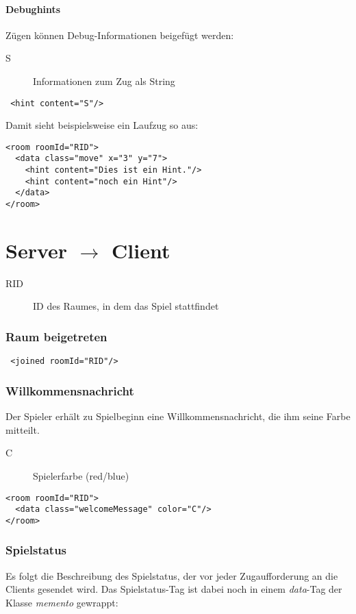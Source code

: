\documentclass[12pt,a4paper, ngerman, oneside]{scrartcl}
\begin{document}
\subsection{Debughints}
Z\"ugen k\"onnen Debug-Informationen beigef\"ugt werden:
\begin{description}
\item[S] Informationen zum Zug als String
\end{description}
\begin{verbatim}
 <hint content="S"/>
\end{verbatim}
Damit sieht beispielsweise ein Laufzug so aus:
\begin{verbatim}
<room roomId="RID">
  <data class="move" x="3" y="7">
    <hint content="Dies ist ein Hint."/>
    <hint content="noch ein Hint"/>
  </data>
</room>
\end{verbatim}



\newpage
\part{Server $\rightarrow$ Client}
\begin{description}
\item[RID] ID des Raumes, in dem das Spiel stattfindet
\end{description}

\section{Raum beigetreten}
 \begin{verbatim}
 <joined roomId="RID"/>
 \end{verbatim}

\section{Willkommensnachricht}
Der Spieler erh\"alt zu Spielbeginn eine Willkommensnachricht, die ihm seine Farbe mitteilt.
\begin{description}
\item[C] Spielerfarbe (red/blue)
\end{description}
\begin{verbatim}
<room roomId="RID">
  <data class="welcomeMessage" color="C"/>
</room>
\end{verbatim}

\section{Spielstatus}
Es folgt die Beschreibung des Spielstatus, der vor jeder Zugaufforderung an die Clients gesendet wird. Das Spielstatus-Tag ist dabei noch in einem \textit{data}-Tag der Klasse \textit{memento} gewrappt:
\end{document}
